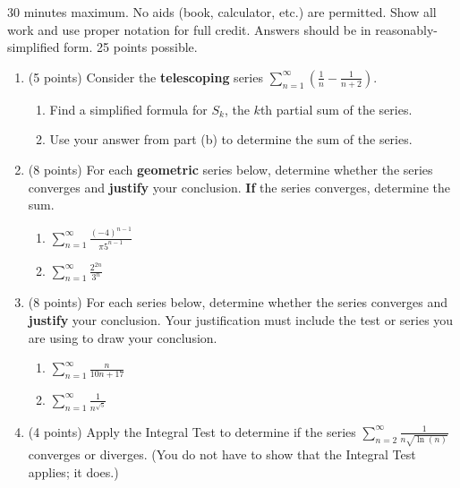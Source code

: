 \documentclass[12pt]{article}
\newcommand{\ds}{\displaystyle}
\begin{document}
30 minutes maximum.  No aids (book, calculator, etc.) are permitted.  Show all work and use proper notation for full credit.  Answers should be in reasonably-simplified form.  25 points possible.

\begin{enumerate}
\item (5 points) Consider the \textbf{telescoping} series $\ds \sum_{n=1}^{\infty} \left( \frac{1}{n}- \frac{1}{n+2}\right).$
	\begin{enumerate}
	\item Find a simplified formula for $S_k$, the $k$th partial sum of the series.
	\vfill
	\item Use your answer from part (b) to determine the sum of the series.\\
	\vfill
	\end{enumerate}
\item (8 points) For each \textbf{geometric} series below, determine whether the series converges and \textbf{justify} your conclusion. \textbf{If} the series converges, determine the sum.
	\begin{enumerate}
	\item $\ds \sum_{n=1}^{\infty} \frac{(-4)^{n-1}}{\pi 5^{n-1}}$
	\vfill
	\item $\ds \sum_{n=1}^{\infty} \frac{2^{2n}}{3^n}$
	\vfill
	\end{enumerate}
\newpage
\item (8 points) For each  series below, determine whether the series converges and \textbf{justify} your conclusion. Your justification must include the test or series you are using to draw your conclusion.
	\begin{enumerate}
	\item $\ds \sum_{n=1}^{\infty} \frac{n}{10n+17}$
	\vfill
	\item $\ds \sum_{n=1}^{\infty} \frac{1}{n^{\sqrt{5}}}$
	\vfill
	\end{enumerate}
\item (4 points) Apply the Integral Test to determine if the series $\ds \sum_{n=2}^{\infty} \frac{1}{n \sqrt{\ln (n)}}$ converges or diverges. (You do not have to show that the Integral Test applies; it does.)
\vfill
\vfill
\end{enumerate}
\end{document}
